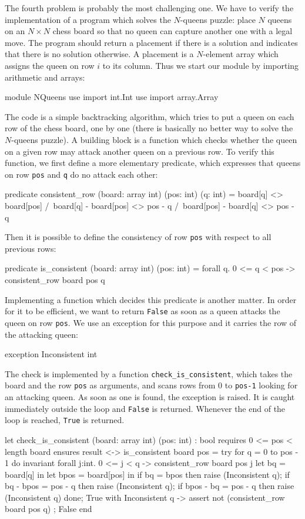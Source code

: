 The fourth problem is probably the most challenging one.
We have to verify the implementation of a program which solves the
$N$-queens puzzle: place $N$ queens on an $N \times N$
chess board so that no queen can capture another one with a
legal move.
The program should return a placement if there is a solution and
indicates that there is no solution otherwise. A placement is a
$N$-element array which assigns the queen on row $i$ to its column.
Thus we start our module by importing arithmetic and arrays:
\begin{whycode}
module NQueens
  use import int.Int
  use import array.Array
\end{whycode}
The code is a simple backtracking algorithm, which tries to put a queen
on each row of the chess board, one by one (there is basically no
better way to solve the $N$-queens puzzle).
A building block is a function which checks whether the queen on a
given row may attack another queen on a previous row. To verify this
function, we first define a more elementary predicate, which expresses
that queens on row \texttt{pos} and \texttt{q} do no attack each other:
\begin{whycode}
  predicate consistent_row (board: array int) (pos: int) (q: int) =
    board[q] <> board[pos] /\
    board[q] - board[pos] <> pos - q /\
    board[pos] - board[q] <> pos - q
\end{whycode}
Then it is possible to define the consistency of row \texttt{pos}
with respect to all previous rows:
\begin{whycode}
  predicate is_consistent (board: array int) (pos: int) =
    forall q. 0 <= q < pos -> consistent_row board pos q
\end{whycode}
Implementing a function which decides this predicate is another
matter. In order for it to be efficient, we want to return
\texttt{False} as soon as a queen attacks the queen on row
\texttt{pos}. We use an exception for this purpose and it carries the
row of the attacking queen:
\begin{whycode}
  exception Inconsistent int
\end{whycode}
The check is implemented by a function \verb|check_is_consistent|,
which takes the board and the row \texttt{pos} as arguments, and scans
rows from 0 to \texttt{pos-1} looking for an attacking queen. As soon
as one is found, the exception is raised. It is caught immediately
outside the loop and \texttt{False} is returned. Whenever the end of
the loop is reached, \texttt{True} is returned.
\begin{whycode}
  let check_is_consistent (board: array int) (pos: int) : bool
    requires { 0 <= pos < length board }
    ensures  { result <-> is_consistent board pos }
  = try
      for q = 0 to pos - 1 do
        invariant {
          forall j:int. 0 <= j < q -> consistent_row board pos j
        }
        let bq   = board[q]   in
        let bpos = board[pos] in
        if bq        = bpos    then raise (Inconsistent q);
        if bq - bpos = pos - q then raise (Inconsistent q);
        if bpos - bq = pos - q then raise (Inconsistent q)
      done;
      True
    with Inconsistent q ->
      assert { not (consistent_row board pos q) };
      False
    end
\end{whycode}
